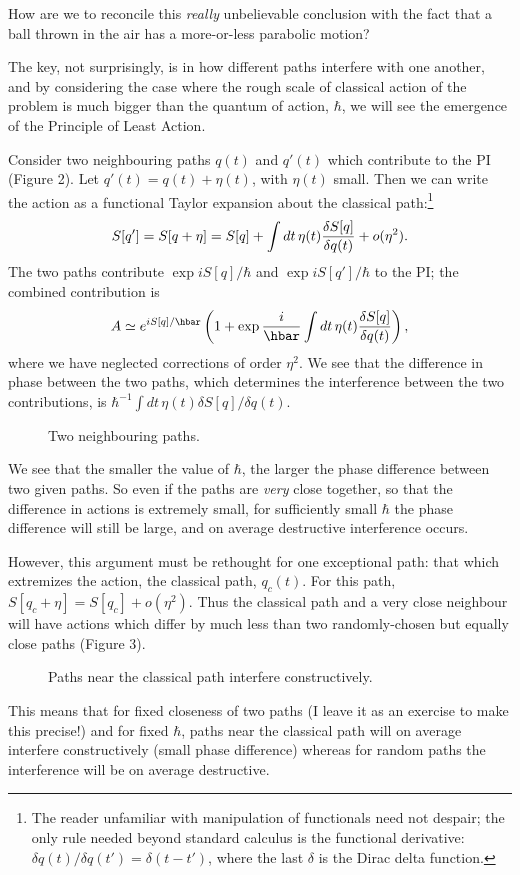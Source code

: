 \documentclass[12pt]{article}
\begin{document}
How are we to reconcile this {\em really} unbelievable conclusion with
the fact that a ball thrown in the air has a more-or-less parabolic
motion?

The key, not surprisingly, is in how different paths interfere with
one another, and by considering the case where the rough scale of
classical action of the problem is much bigger than the quantum of
action, $\hbar$, we will see the emergence of the Principle of Least
Action.

Consider two neighbouring paths $q(t)$ and $q'(t)$
which contribute to the PI
(Figure 2). Let $q'(t)=q(t)+\eta(t)$, with $\eta(t)$ small. Then we
can write the action as a functional Taylor expansion about the
classical path:\footnote{The reader unfamiliar with manipulation of
  functionals need not despair; the only rule needed beyond
  standard calculus is the functional derivative: $\delta q(t)/\delta
  q(t')=\delta(t-t')$, where the last $\delta$ is the Dirac delta
  function.}
\[ S[q']=S[q+\eta]=S[q]+\int dt\,\eta(t){\delta S[q]\over\delta q(t)}
+o(\eta^2). \]
The two paths contribute $\exp iS[q]/\hbar$ and $\exp iS[q']/\hbar$ to
the PI; the combined contribution is
\[ 
A\simeq e^{iS[q]/\hbar}\left(1+\exp {i\over\hbar}
\int dt\,\eta(t){\delta S[q]\over\delta q(t)}\right),
\]
where we have neglected corrections of order $\eta^2$. We see that the
difference in phase between the two paths, which determines the
interference between the two contributions, is 
$\hbar^{-1}\int dt\,\eta(t)\delta S[q]/\delta q(t)$.
\begin{figure}[ht]
\epsfysize=5cm
\centerline{}
\caption{Two neighbouring paths.}
\end{figure}

We see that the smaller the value of $\hbar$, the larger the phase
difference between two given paths. So even if the paths are {\em very}
close together, so that the difference in actions is extremely small,
for sufficiently small $\hbar$ the phase difference will still be
large, and on average destructive interference occurs.

However, this argument must be rethought for one exceptional path: that
which extremizes the action, \ie the classical path, $q_c(t)$. 
For this path, $S[q_c+\eta]=S[q_c]+o(\eta^2)$. Thus the classical path
and a very close neighbour will have actions which differ by much less
than two randomly-chosen but equally close paths (Figure 3).
\begin{figure}[hb]
\epsfysize=5cm
\centerline{}
\caption{Paths near the classical path interfere constructively.}
\end{figure}
This means that for fixed closeness of two paths (I leave it as an
exercise to make this precise!) and for fixed $\hbar$, paths near the
classical path will on average interfere constructively (small phase
difference) whereas for random paths the interference will be on
average destructive.
\end{document}
